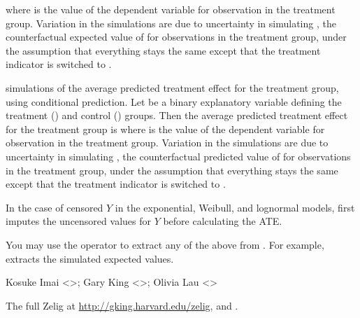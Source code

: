 \begin{Value}
\begin{ldescription}
where  is the value of the dependent variable for
observation  in the treatment group.  Variation in the
simulations are due to uncertainty in simulating ,
the counterfactual expected value of  for observations in the
treatment group, under the assumption that everything stays the
same except that the treatment indicator is switched to . 
\item[\code{qi\$ate.pr}] simulations of the average predicted
treatment effect for the treatment group, using conditional
prediction. Let  be a binary explanatory variable defining
the treatment () and control () groups.  Then the
average predicted treatment effect for the treatment group is
where  is the value of the dependent variable for
observation  in the treatment group.  Variation in the
simulations are due to uncertainty in simulating
, the counterfactual predicted value of
 for observations in the treatment group, under the
assumption that everything stays the same except that the
treatment indicator is switched to . 

\end{ldescription}


In the case of censored $Y$ in the exponential, Weibull, and lognormal
models,  first imputes the uncensored values for $Y$ before
calculating the ATE.  

You may use the \code{\$} operator to extract any of the
above from .  For example,  extracts the
simulated expected values.
\end{Value}
\begin{Author}\relax
Kosuke Imai <>; Gary King
<>; Olivia Lau <>
\end{Author}
\begin{SeeAlso}\relax
The full Zelig at \url{http://gking.harvard.edu/zelig}, and .
\end{SeeAlso}


